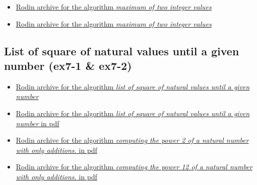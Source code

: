 \documentclass[ 12pt]{article}
\begin{document}
\begin{itemize}
\item[] 
  \href{https://mery54.github.io/mery/eventb/ex4.zip}{Rodin archive 
    for the algorithm \textit{ maximum of two integer values}}

\item[] 
  \href{https://mery54.github.io/mery/eventb/ex4.pdf}{Rodin archive 
    for the algorithm \textit{ maximum of two integer values}}  

    
\end{itemize}



\subsection{List of square of  natural values until a given number
  (ex7-1 \& ex7-2)}
\label{sec:comp-sum-elem}


\begin{itemize}
\item[] 
  \href{https://mery54.github.io/mery/eventb/ex7-1.zip}{Rodin archive 
    for  the algorithm \textit{list of square of  natural values 
      until a given number}}

\item[] 
  \href{https://mery54.github.io/mery/eventb/ex7-1.pdf}{Rodin archive 
    for  the algorithm \textit{list of square of  natural values 
      until a given number} in pdf}  

 \item[] 
  \href{https://mery54.github.io/mery/eventb/ex7-2.zip}{Rodin archive 
    for  the algorithm \textit{computing  the power 2 of a natural 
      number with only additions.} in pdf}

 \item[] 
  \href{https://mery54.github.io/mery/eventb/ex7-2.pdf}{Rodin archive 
    for  the algorithm \textit{computing  the power 12 of a natural 
      number with only additions.} in pdf} 
 
\end{itemize}
\end{document}
